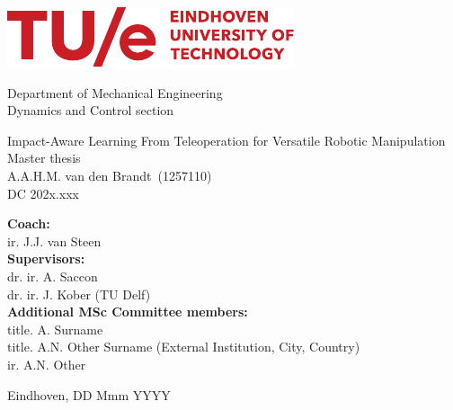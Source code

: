 \documentclass[11pt]{report}
\numberwithin{equation}{chapter}		%
\numberwithin{figure}{chapter}			%
\numberwithin{table}{chapter}			%
\newcommand{\deltitle}{Impact-Aware Learning From Teleoperation for Versatile Robotic Manipulation}        %
\newcommand{\StudentName}{A.A.H.M. van den Brandt}               %
\newcommand{\StudentID}{1257110}                    %
\newcommand{\DCcode}{202x.xxx}                      %
\begin{document}
	\hypersetup{pageanchor=false}
	\begin{titlepage}
	\centering
	\includegraphics[scale=1.9]{Graphics/TUE-logo.pdf}\\[0mm]
	\begin{center}
		{\Large Department of Mechanical Engineering}\\[2mm]
		{\Large Dynamics and Control section}\\[20mm]
	\end{center}

	\begin{center}
		{\Huge \deltitle}\\[2mm]
		{\Large Master thesis}\\[2mm]
		{\large \StudentName \ (\StudentID)}\\[1mm]
		{\large DC \DCcode}\\[70mm]
	\end{center}
		
	\flushleft\large {\textbf{Coach:}} \\
	{ir. J.J. van Steen}   \\    


	\flushleft\large {\textbf{Supervisors:}} \\
	{dr. ir. A. Saccon}             \\
	{dr. ir. J. Kober (TU Delf)}             \\

	\flushleft\large {\textbf{Additional MSc Committee members:}} \\
	{title. A. Surname}  \\  
	{title. A.N. Other Surname (External Institution, City, Country)}  \\  %
	{ir. A.N. Other}                 

	\vfill\center Eindhoven, DD Mmm YYYY \\ %
		
	\end{titlepage}
\end{document}
